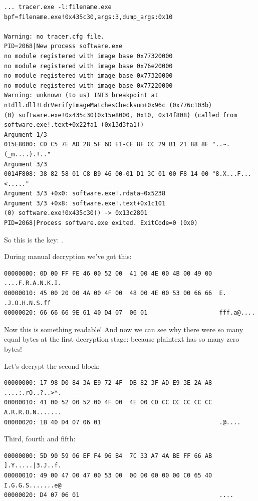 \begin{lstlisting}
... tracer.exe -l:filename.exe bpf=filename.exe!0x435c30,args:3,dump_args:0x10

Warning: no tracer.cfg file.
PID=2068|New process software.exe
no module registered with image base 0x77320000
no module registered with image base 0x76e20000
no module registered with image base 0x77320000
no module registered with image base 0x77220000
Warning: unknown (to us) INT3 breakpoint at ntdll.dll!LdrVerifyImageMatchesChecksum+0x96c (0x776c103b)
(0) software.exe!0x435c30(0x15e8000, 0x10, 0x14f808) (called from software.exe!.text+0x22fa1 (0x13d3fa1))
Argument 1/3 
015E8000: CD C5 7E AD 28 5F 6D E1-CE 8F CC 29 B1 21 88 8E "..~.(_m....).!.."
Argument 3/3 
0014F808: 38 82 58 01 C8 B9 46 00-01 D1 3C 01 00 F8 14 00 "8.X...F...<....."
Argument 3/3 +0x0: software.exe!.rdata+0x5238
Argument 3/3 +0x8: software.exe!.text+0x1c101
(0) software.exe!0x435c30() -> 0x13c2801
PID=2068|Process software.exe exited. ExitCode=0 (0x0)
\end{lstlisting}

So this is the key: .

During manual decryption we've got this:

\begin{lstlisting}
00000000: 0D 00 FF FE 46 00 52 00  41 00 4E 00 4B 00 49 00  ....F.R.A.N.K.I.
00000010: 45 00 20 00 4A 00 4F 00  48 00 4E 00 53 00 66 66  E. .J.O.H.N.S.ff
00000020: 66 66 66 9E 61 40 D4 07  06 01                    fff.a@....
\end{lstlisting}

Now this is something readable!
And now we can see why there were so many equal bytes at the first decryption stage:
because plaintext has so many zero bytes!

Let's decrypt the second block:

\begin{lstlisting}
00000000: 17 98 D0 84 3A E9 72 4F  DB 82 3F AD E9 3E 2A A8  ....:.rO..?..>*.
00000010: 41 00 52 00 52 00 4F 00  4E 00 CD CC CC CC CC CC  A.R.R.O.N.......
00000020: 1B 40 D4 07 06 01                                 .@....
\end{lstlisting}

Third, fourth and fifth:

\begin{lstlisting}
00000000: 5D 90 59 06 EF F4 96 B4  7C 33 A7 4A BE FF 66 AB  ].Y.....|3.J..f.
00000010: 49 00 47 00 47 00 53 00  00 00 00 00 00 C0 65 40  I.G.G.S.......e@
00000020: D4 07 06 01                                       ....
\end{lstlisting}

